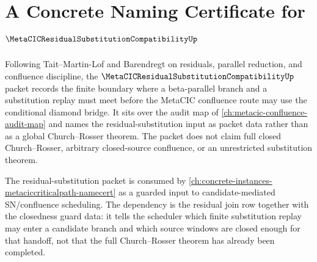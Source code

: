 \chapter{A Concrete Naming Certificate for $\MetaCICResidualSubstitutionCompatibilityUp$}
\label{ch:concrete-instances-metacic-residual-substitution-compatibility-namecert}

Following Tait--Martin-Lof and Barendregt on residuals, parallel reduction, and confluence discipline, the $\MetaCICResidualSubstitutionCompatibilityUp$ packet records the finite boundary where a beta-parallel branch and a substitution replay must meet before the MetaCIC confluence route may use the conditional diamond bridge. It sits over the audit map of \autoref{ch:metacic-confluence-audit-map} and names the residual-substitution input as packet data rather than as a global Church--Rosser theorem. The packet does not claim full closed Church--Rosser, arbitrary closed-source confluence, or an unrestricted substitution theorem.

The residual-substitution packet is consumed by \autoref{ch:concrete-instances-metaciccriticalpath-namecert} as a guarded input to candidate-mediated SN/confluence scheduling. The dependency is the residual join row together with the closedness guard data: it tells the scheduler which finite substitution replay may enter a candidate branch and which source windows are closed enough for that handoff, not that the full Church--Rosser theorem has already been completed.

